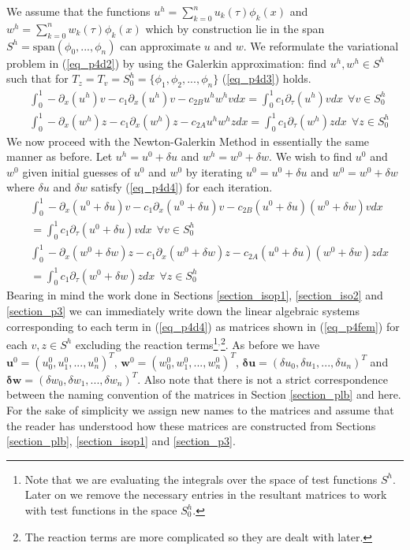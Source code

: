 \documentclass[11pt,fleqn]{article}
\theoremstyle{defstyle}
\begin{document}
We assume that the functions $u^h =\sum^n_{k=0} u_k(\tau) \phi_k(x)$ and $w^h =\sum^n_{k=0} w_k(\tau) \phi_k(x)$ which by construction lie in the span $S^h=\text{span}(\phi_0,...,\phi_n)$ can approximate $u$ and $w$. We reformulate the variational problem in (\ref{eq_p4d2}) by using the Galerkin approximation: find $u^h, w^h \in S^h$ such that for $T_z = T_v = S^h_0=\{\phi_1, \phi_2,...,\phi_n \}$ (\ref{eq_p4d3}) holds.
\begin{equation}
\begin{aligned}
&\int_0^1 -\partial_{x}(u^h)v - c_1\partial_x(u^h)v - c_{2B}u^hw^hvdx = \int_0^1 c_1\partial_\tau(u^h)v dx~~\forall v \in S^h_0 \\
&\int_0^1-\partial_{x}(w^h)z - c_1\partial_x(w^h)z - c_{2A}u^hw^hzdx = \int_0^1 c_1\partial_\tau(w^h)zdx~~\forall z \in S^h_0 
\end{aligned}
\label{eq_p4d3}
\end{equation}
We now proceed with the Newton-Galerkin Method in essentially the same manner as before. Let $u^h = u^0 + \delta u$ and $w^h=w^0 +\delta w$. We wish to find $u^0$ and $w^0$ given initial guesses of $u^0$ and $w^0$ by iterating $u^0 = u^0 + \delta u$ and $w^0=w^0+\delta w$ where $\delta u$ and $\delta w$ satisfy (\ref{eq_p4d4}) for each iteration.
\begin{equation}
\begin{aligned}
&\int_0^1 -\partial_{x}(u^0 + \delta u)v - c_1\partial_x(u^0 + \delta u)v - c_{2B}(u^0 + \delta u)(w^0 +\delta w)vdx \\ &= \int_0^1 c_1\partial_\tau(u^0 + \delta u)v dx ~~\forall v \in S^h_0 \\
&\int_0^1-\partial_{x}(w^0 +\delta w)z - c_1\partial_x(w^0 +\delta w)z - c_{2A}(u^0 + \delta u)(w^0 +\delta w)zdx  \\ &= \int_0^1 c_1\partial_\tau(w^0 +\delta w)zdx  ~~\forall z \in S^h_0
\end{aligned}
\label{eq_p4d4}
\end{equation}
Bearing in mind the work done in Sections \ref{section_isop1}, \ref{section_iso2} and \ref{section_p3} we can immediately write down the linear algebraic systems corresponding to each term in (\ref{eq_p4d4}) as matrices shown in (\ref{eq_p4fem}) for each $v,z \in S^h$ excluding the reaction terms\footnote{Note that we are evaluating the integrals over the space of test functions $S^h$. Later on we remove the necessary entries in the resultant matrices to work with test functions in the space $S^h_0$.}$^{,}$\footnote{The reaction terms are more complicated so they are dealt with later.}. As before we have $\mathbf{u}^0=\left(u^0_0,u^0_1,...,u^0_n\right)^T$, $\mathbf{w}^0=\left(w^0_0,w^0_1,...,w^0_n\right)^T$, $\mathbf{\delta u}=\left(\delta u_0,\delta u_1,...,\delta u_n\right)^T$ and $\mathbf{\delta w}=\left(\delta w_0,\delta w_1,...,\delta w_n\right)^T$. Also note that there is not a strict correspondence between the naming convention of the matrices in Section \ref{section_plb} and here. For the sake of simplicity we assign new names to the matrices and assume that the reader has understood how these matrices are constructed from Sections \ref{section_plb}, \ref{section_isop1} and \ref{section_p3}.
\end{document}
